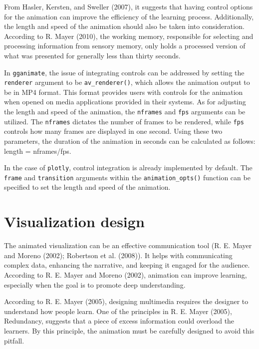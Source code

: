 From Hasler, Kersten, and Sweller (2007), it suggests that having control options for the animation can improve the efficiency of the learning process. Additionally, the length and speed of the animation should also be taken into consideration. According to R. Mayer (2010), the working memory, responsible for selecting and processing information from sensory memory, only holds a processed version of what was presented for generally less than thirty seconds.

In \texttt{gganimate}, the issue of integrating controls can be addressed by setting the \texttt{renderer} argument to be \texttt{av\_renderer()}, which allows the animation output to be in MP4 format. This format provides users with controls for the animation when opened on media applications provided in their systems. As for adjusting the length and speed of the animation, the \texttt{nframes} and \texttt{fps} arguments can be utilized. The \texttt{nframes} dictates the number of frames to be rendered, while \texttt{fps} controls how many frames are displayed in one second. Using these two parameters, the duration of the animation in seconds can be calculated as follows: length = nframes/fps.

In the case of \texttt{plotly}, control integration is already implemented by default. The \texttt{frame} and \texttt{transition} arguments within the \texttt{animation\_opts()} function can be specified to set the length and speed of the animation.

\hypertarget{visualization-design}{%
\section{Visualization design}\label{visualization-design}}

The animated visualization can be an effective communication tool (R. E. Mayer and Moreno (2002); Robertson et al. (2008)). It helps with communicating complex data, enhancing the narrative, and keeping it engaged for the audience. According to R. E. Mayer and Moreno (2002), animation can improve learning, especially when the goal is to promote deep understanding.

According to R. E. Mayer (2005), designing multimedia requires the designer to understand how people learn. One of the principles in R. E. Mayer (2005), Redundancy, suggests that a piece of excess information could overload the learners. By this principle, the animation must be carefully designed to avoid this pitfall.

